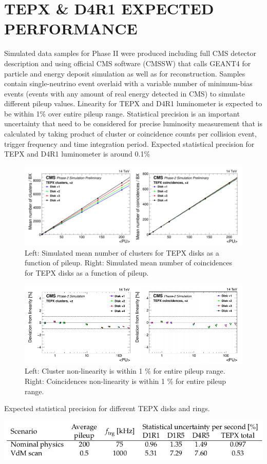 \documentclass[a4paper,11pt]{article}
\begin{document}
\section{TEPX \& D4R1 EXPECTED PERFORMANCE}
Simulated data samples for Phase II were produced including full CMS detector description and using official CMS software (CMSSW) that calls GEANT4 for particle and energy deposit simulation as well as for reconstruction. Samples contain single-neutrino event overlaid with a variable number of minimum-bias events (events with any amount of real energy detected in CMS) to simulate different pileup values. Linearity for TEPX and D4R1 luminometer is expected to be within 1\% over entire pileup range. Statistical precision is an important uncertainty that need to be considered for precise luminosity measurement that is calculated by taking product of cluster or coincidence counts per collision event, trigger frequency and time integration period. Expected statistical precision for TEPX and D4R1 luminometer is around 0.1\%


\begin{figure}[htb]
  \centering
  \includegraphics[width=0.6\columnwidth]{SP4.png}
  \caption{Left: Simulated mean number of clusters for TEPX disks as a function of pileup. Right: Simulated mean number of coincidences for TEPX disks as a function of pileup.}
  \label{fig:CMS}
\end{figure}


\begin{figure}[htb]
  \centering
  \includegraphics[width=0.6\columnwidth]{residuals_new.png}
  \caption{Left: Cluster non-linearity is within 1 \% for entire pileup range. Right: Coincidences non-linearity is within 1 \% for entire pileup range. }
  \label{fig:CMS}
\end{figure}


\begin{table}[htb]
  \centering
   \caption{ Expected statistical precision for different TEPX disks and rings.}
  \includegraphics[width=0.6\columnwidth]{SP2.png}
  \label{Table:CMS}
\end{table}
\end{document}
